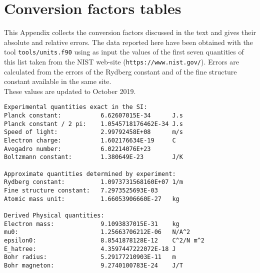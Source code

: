 \documentclass[12pt,a4paper,twoside]{report}
\begin{document}
{{\color{dark-blue}\chapter{Conversion factors tables}}

This Appendix collects the conversion factors discussed in the text
and gives their absolute and relative errors. 
The data reported here have been obtained with the tool 
\texttt{tools/units.f90} using as input the values of the first seven
quantities of this list taken from the NIST web-site 
(\texttt{https://www.nist.gov/}). 
Errors are calculated from the errors of the Rydberg constant and of
the fine structure constant available in the same site. \\
These values are updated to October 2019.

\begin{tcolorbox}
\begin{verbatim}
Experimental quantities exact in the SI:
Planck constant:           6.62607015E-34      J.s
Planck constant / 2 pi:    1.0545718176462E-34 J.s
Speed of light:            2.99792458E+08      m/s
Electron charge:           1.602176634E-19     C
Avogadro number:           6.02214076E+23
Boltzmann constant:        1.380649E-23        J/K

Approximate quantities determined by experiment:
Rydberg constant:          1.0973731568160E+07 1/m
Fine structure constant:   7.2973525693E-03
Atomic mass unit:          1.66053906660E-27   kg

Derived Physical quantities:
Electron mass:             9.1093837015E-31    kg
mu0:                       1.25663706212E-06   N/A^2
epsilon0:                  8.8541878128E-12    C^2/N m^2
E_hatree:                  4.3597447222072E-18 J
Bohr radius:               5.29177210903E-11   m
Bohr magneton:             9.2740100783E-24    J/T


\end{verbatim}
\end{tcolorbox}}
\end{document}
